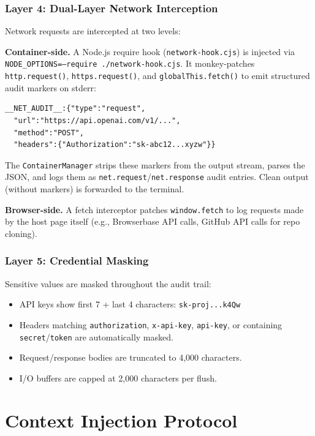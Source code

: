 \documentclass[11pt,twocolumn]{article}
\begin{document}
\subsubsection{Layer 4: Dual-Layer Network Interception}

Network requests are intercepted at two levels:

\textbf{Container-side.} A Node.js require hook (\texttt{network-hook.cjs}) is injected via \texttt{NODE\_OPTIONS=--require ./network-hook.cjs}. It monkey-patches \texttt{http.request()}, \texttt{https.request()}, and \texttt{globalThis.fetch()} to emit structured audit markers on stderr:

\begin{lstlisting}
__NET_AUDIT__:{"type":"request",
  "url":"https://api.openai.com/v1/...",
  "method":"POST",
  "headers":{"Authorization":"sk-abc12...xyzw"}}
\end{lstlisting}

The \texttt{ContainerManager} strips these markers from the output stream, parses the JSON, and logs them as \texttt{net.request}/\texttt{net.response} audit entries. Clean output (without markers) is forwarded to the terminal.

\textbf{Browser-side.} A fetch interceptor patches \texttt{window.fetch} to log requests made by the host page itself (e.g., Browserbase API calls, GitHub API calls for repo cloning).

\subsubsection{Layer 5: Credential Masking}

Sensitive values are masked throughout the audit trail:

\begin{itemize}[noitemsep]
  \item API keys show first 7 + last 4 characters: \texttt{sk-proj...k4Qw}
  \item Headers matching \texttt{authorization}, \texttt{x-api-key}, \texttt{api-key}, or containing \texttt{secret}/\texttt{token} are automatically masked.
  \item Request/response bodies are truncated to 4,000 characters.
  \item I/O buffers are capped at 2,000 characters per flush.
\end{itemize}

\section{Context Injection Protocol}
\label{sec:protocol}
\end{document}
